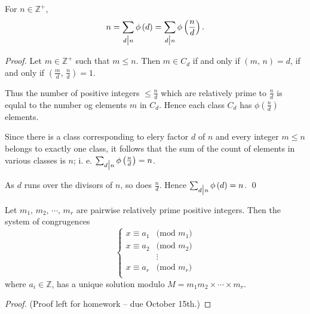 \begin{theorem}
    For $n \in \mathbb{Z}^+$,
    \[
        n = \sum_{d \bigm| n} \phi\left(d\right) = \sum_{d \bigm| n} \phi\left(\frac{n}{d}\right).
    \]
\end{theorem}

\begin{proof}
    Let $m \in \mathbb{Z}^+$ such that $m \leq n$.
    Then $m \in C_d$ if and only if $\left(m,\,n\right)=d$, if and only if $\left(\frac{m}{d},\,\frac{n}{d}\right)=1$.

    Thus the number of positive integers $\leq\frac{n}{d}$ which are relatively prime to $\frac{n}{d}$
    is equlal to the number og elements $m$ in $C_d$.
    Hence each class $C_d$ has $\phi\left(\frac{n}{d}\right)$ elements.

    Since there is a class corresponding to elery factor $d$ of $n$ and every integer $m\leq n$ belongs to
    exactly one class, it follows that the sum of the count of elements in various classes is $n$;
    i. e. $\sum_{d \bigm| n} \phi\left(\frac{n}{d}\right)=n$.

    As $d$ runs over the divisors of $n$, so does $\frac{n}{d}$.
    Hence $\sum_{d \bigm| n} \phi\left(d\right)=n$.
    \qed 
\end{proof}

\begin{theorem}
    Let $m_1,\,m_2,\,\cdots,\,m_r$ are pairwise relatively prime positive integers.
    Then the system of congrugences
    \[
        \begin{cases}
            x\equiv a_1 & \mbox{(mod $m_1$)} \\
            x\equiv a_2 & \mbox{(mod $m_2$)} \\
            & \vdots \\
            x\equiv a_r & \mbox{(mod $m_r$)} \\
        \end{cases}
    \]
    where $a_i \in \mathbb{Z}$, has a unique solution modulo $M=m_1m_2\times\cdots\times m_r$.
\end{theorem}

\begin{proof}
    (Proof left for homework -- due October 15th.)
\end{proof}


